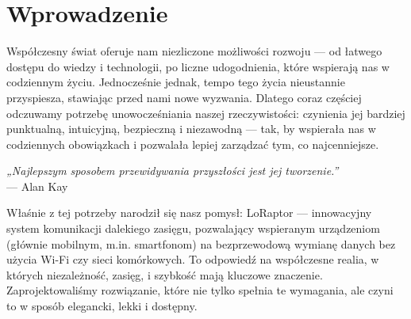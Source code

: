 \section{Wprowadzenie}

Współczesny świat oferuje nam niezliczone możliwości rozwoju --- od łatwego dostępu do wiedzy i technologii,
po liczne udogodnienia, które wspierają nas w codziennym życiu. Jednocześnie jednak, tempo tego życia
nieustannie przyspiesza, stawiając przed nami nowe wyzwania. Dlatego coraz częściej odczuwamy potrzebę
unowocześniania naszej rzeczywistości: czynienia jej bardziej punktualną, intuicyjną,
bezpieczną i niezawodną --- tak, by wspierała nas w codziennych obowiązkach i pozwalała lepiej zarządzać tym,
co najcenniejsze.

\begin{tcolorbox}[
	colback=gray!5!white, 
	colframe=gray!75!black, 
	boxrule=0.8pt, 
	arc=5pt,
	enhanced,
	drop shadow,
	top=8pt,
	bottom=8pt,
	center
]
\centering
\emph{„Najlepszym sposobem przewidywania przyszłości jest jej tworzenie.”} \\
\smallskip
\hfill — Alan Kay
\end{tcolorbox}

Właśnie z tej potrzeby narodził się nasz pomysł: LoRaptor --- innowacyjny system komunikacji dalekiego zasięgu,
pozwalający wspieranym urządzeniom (głównie mobilnym, m.in. smartfonom) na bezprzewodową wymianę danych bez użycia Wi-Fi czy sieci komórkowych.
To odpowiedź na współczesne realia, w których niezależność, zasięg, i szybkość mają kluczowe znaczenie.
Zaprojektowaliśmy rozwiązanie, które nie tylko spełnia te wymagania, ale czyni to w sposób elegancki, lekki i dostępny.